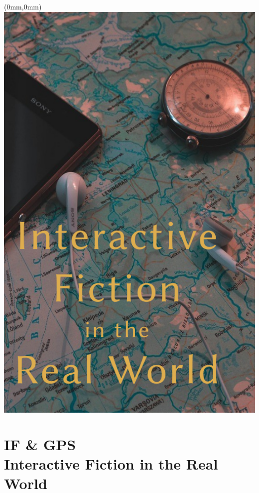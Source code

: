 \documentclass[11.75pt,openany,final]{memoir}
\begin{document}
\chapter*{}
\begin{textblock*}{70.9mm}(0mm,0mm)
\includegraphics[width=\paperwidth]{./media/images/gps_splash}
\end{textblock*}
\clearpage
\chapter{IF \& GPS\\ \small{Interactive Fiction in the Real World}}

\end{document}
